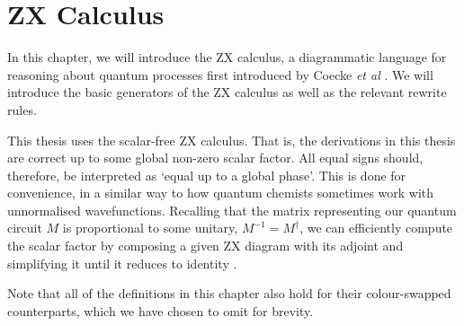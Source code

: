 \chapter{ZX Calculus}%
\label{zx-calculus}

In this chapter, we will introduce the ZX calculus, a diagrammatic language for reasoning about quantum processes first introduced by Coecke \textit{et al} \cite{Coecke2011}. We will introduce the basic generators of the ZX calculus as well as the relevant rewrite rules.

This thesis uses the scalar-free ZX calculus. That is, the derivations in this thesis are correct up to some global non-zero scalar factor. All equal signs should, therefore, be interpreted as `equal up to a global phase'. This is done for convenience, in a similar way to how quantum chemists sometimes work with unnormalised wavefunctions. Recalling that the matrix representing our quantum circuit $M$ is proportional to some unitary, $M^{-1} = M^\dagger$, we can efficiently compute the scalar factor by composing a given ZX diagram with its adjoint and simplifying it until it reduces to identity \cite{Wetering2020}.

Note that all of the definitions in this chapter also hold for their colour-swapped counterparts, which we have chosen to omit for brevity.

